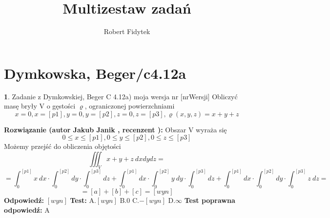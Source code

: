 \documentclass[12pt, a4paper]{article}
\title{Multizestaw zadań}
\author{Robert Fidytek}
\date{}
\theoremstyle{definition} %
\newtheorem{zad}{}
\newcommand{\kategoria}[1]{\section{#1}} %
\newcommand{\zadStart}[1]{\begin{zad}#1\newline} %
\newcommand{\zadStop}{\end{zad}}   %
\newcommand{\rozwStart}[2]{\noindent \textbf{Rozwiązanie (autor #1 , recenzent #2): }\newline} %
\newcommand{\rozwStop}{\newline}                                            %
\newcommand{\odpStart}{\noindent \textbf{Odpowiedź:}\newline}    %
\newcommand{\odpStop}{\newline}                                             %
\newcommand{\testStart}{\noindent \textbf{Test:}\newline} %
\newcommand{\testStop}{\newline} %
\newcommand{\kluczStart}{\noindent \textbf{Test poprawna odpowiedź:}\newline} %
\newcommand{\kluczStop}{\newline} %
\begin{document}
\maketitle


\kategoria{Dymkowska, Beger/c4.12a}
\zadStart{Zadanie z Dymkowskiej, Beger C 4.12a) moja wersja nr [nrWersji]}
Obliczyć masę bryły V o gęstości $\varrho$, ograniczonej powierzchniami
$$x=0, x=[p1], y=0, y=[p2], z=0, z=[p3], \varrho(x,y,z)=x+y+z$$
\zadStop
\rozwStart{Jakub Janik}{}
Obszar V wyraża się $$0 \leq x \leq [p1], 0 \leq y \leq [p2], 0 \leq z \leq [p3]$$
Możemy przejść do obliczenia objętości
$$\iiint_V x+y+z\ dxdydz=$$
$$=\int_0^{[p1]}x\ dx\cdot\int_0^{[p2]}dy\cdot\int_0^{[p3]}dz+\int_0^{[p1]}dx\cdot\int_0^{[p2]}y\ dy\cdot\int_0^{[p3]}dz+\int_0^{[p1]}dx\cdot\int_0^{[p2]}dy\cdot\int_0^{[p3]}z\ dz=$$
$$=[a]+[b]+[c]=[wyn]$$
\rozwStop
\odpStart
$[wyn]$
\odpStop
\testStart
A.$[wyn]$
B.$0$
C.$-[wyn]$
D.$\infty$
\testStop
\kluczStart
A
\kluczStop
\end{document}
